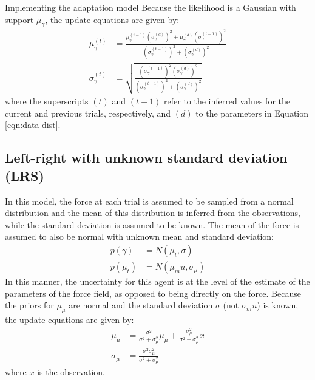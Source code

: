 \documentclass{report}
\def \eref #1{Equation \ref{#1}}   %
\begin{document}
\begin{chapter}{Implementing the adaptation model}
Because the likelihood is a Gaussian with support $\mu_\gamma$, the update
equations are given by:
\begin{align}
  \mu_\gamma^{(t)} &= \frac{\mu_\gamma^{(t-1)}\left(\sigma_\gamma^{(d)}\right)^2 + \mu_\gamma^{(d)}\left(\sigma_\gamma^{(t-1)}\right)^2}{\left(\sigma_\gamma^{(t-1)}\right)^2 + \left(\sigma_\gamma^{(d)}\right)^2} \\
  \sigma_\gamma^{(t)} & = \sqrt{\frac{\left(\sigma_\gamma^{(t-1)}\right)^2\left(\sigma_\gamma^{(d)}\right)^2}{\left(\sigma_\gamma^{(t-1)}\right)^2 + \left(\sigma_\gamma^{(d)}\right)^2}}
\end{align}
where the superscripts $(t)$ and $(t-1)$ refer to the inferred values for the current and previous trials, respectively, and $(d)$ to the parameters in \eref{eqn:data-dist}.

\subsection{Left-right with unknown standard deviation (LRS)}
In this model, the force at each trial is assumed to be sampled from a normal
distribution and the mean of this distribution is inferred from the
observations, while the standard deviation is assumed to be known. The mean of
the force is assumed to also be normal with unknown mean and standard
deviation:
\begin{align}
  p(\gamma) &= N(\mu_t, \sigma) \\
  p(\mu_t) &= N(\mu_mu, \sigma_\mu)
\end{align}
In this manner, the uncertainty for this agent is at the level of the estimate
of the parameters of the force field, as opposed to being directly on the
force. Because the priors for $\mu_\mu$ are normal and the standard deviation
$\sigma$ (not $\sigma_mu$) is known, the update equations are given by:
\begin{align}
  \mu_\mu &= \frac{\sigma^2}{\sigma^2 + \sigma_\mu^2}\mu_\mu + \frac{\sigma_\mu^2}{\sigma^2 + \sigma_\mu^2} x \\
  \sigma_\mu &= \frac{\sigma^2\sigma_\mu^2}{\sigma^2 + \sigma_\mu^2}
\end{align}
where $x$ is the observation.


\end{chapter}
\end{document}
